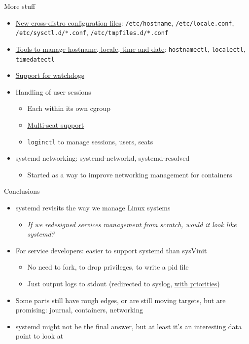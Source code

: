 \documentclass[11pt,final,usepdftitle=false]{beamer}
\begin{document}
\begin{frame}{More stuff}
	\begin{itemize}
		\item \href{http://0pointer.net/blog/projects/the-new-configuration-files.html}{\ul{New cross-distro configuration files}}: \texttt{/etc/hostname}, \texttt{/etc/locale.conf}, \texttt{/etc/sysctl.d/*.conf}, \texttt{/etc/tmpfiles.d/*.conf}
			\hbr
		\item \href{http://www.certdepot.net/rhel7-get-started-systemd/}{\ul{Tools to manage hostname, locale, time and date}}: \texttt{hostnamectl}, \texttt{localectl}, \texttt{timedatectl}
			\hbr
		\item \href{http://0pointer.net/blog/projects/watchdog.html}{\ul{Support for watchdogs}}
			\hbr
		\item Handling of user sessions
			\begin{itemize}
				\item Each within its own cgroup
					\hbr
				\item \href{http://0pointer.net/blog/projects/multi-seat.html}{\ul{Multi-seat support}}
					\hbr
				\item \texttt{loginctl} to manage sessions, users, seats
			\end{itemize}
			\hbr
		\item systemd networking: systemd-networkd, systemd-resolved
			\begin{itemize}
				\item Started as a way to improve networking management for containers
			\end{itemize}
	\end{itemize}
\end{frame}

\begin{frame}{Conclusions}
	\begin{itemize}
		\item systemd revisits the way we manage Linux systems
			\begin{itemize}
			\item \textsl{If we redesigned services management from scratch, would it look like systemd?}
			\end{itemize}
			\hbr

		\item For service developers: easier to support systemd than sysVinit
					\begin{itemize}
						\item No need to fork, to drop privileges, to write a pid file
							\hbr
						\item Just output logs to stdout (redirected to syslog, \href{http://0pointer.net/blog/projects/journal-submit.html}{\ul{with priorities}})
					\end{itemize}
							\br

		\item Some parts still have rough edges, or are still moving targets, but are promising: journal, containers, networking
			\br
		\item systemd might not be the final answer, but at least it's an interesting data point to look at
	\end{itemize}
\end{frame}
\end{document}
